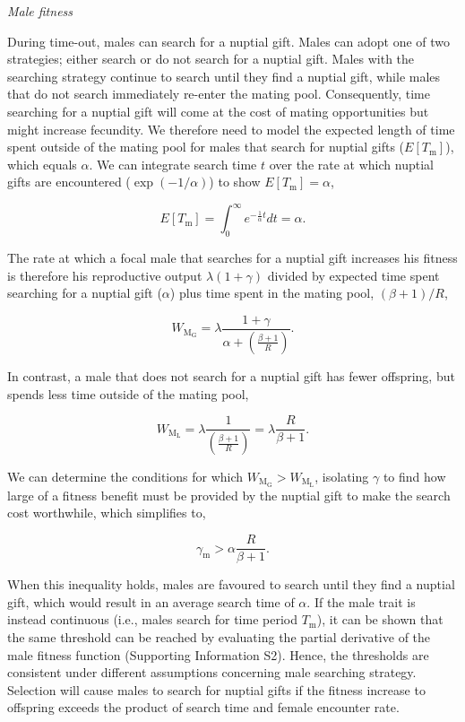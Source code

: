 \documentclass[
]{article}
\begin{document}
\emph{Male fitness}

During time-out, males can search for a nuptial gift. Males can adopt
one of two strategies; either search or do not search for a nuptial
gift. Males with the searching strategy continue to search until they
find a nuptial gift, while males that do not search immediately re-enter
the mating pool. Consequently, time searching for a nuptial gift will
come at the cost of mating opportunities but might increase fecundity.
We therefore need to model the expected length of time spent outside of
the mating pool for males that search for nuptial gifts
(\(E[T_{\mathrm{m}}]\)), which equals \(\alpha\). We can integrate
search time \(t\) over the rate at which nuptial gifts are encountered
(\(\exp(-1/\alpha)\)) to show \(E[T_{\mathrm{m}}] = \alpha\),

\[E[T_{\mathrm{m}}] = \int_{0}^{\infty}e^{- \frac{1}{\alpha}t}dt = \alpha.\]

The rate at which a focal male that searches for a nuptial gift
increases his fitness is therefore his reproductive output
\(\lambda(1 + \gamma)\) divided by expected time spent searching for a
nuptial gift (\(\alpha\)) plus time spent in the mating pool,
\((\beta + 1)/R\),

\[W_{\mathrm{M_{G}}} = \lambda \frac{1 + \gamma}{\alpha + \left( \frac{\beta + 1}{R} \right)}.\]

In contrast, a male that does not search for a nuptial gift has fewer
offspring, but spends less time outside of the mating pool,

\[W_{\mathrm{M_{L}}} = \lambda \frac{1}{\left(\frac{\beta+1}{R} \right)} = \lambda \frac{R}{\beta + 1}.\]

We can determine the conditions for which
\(W_{\mathrm{M_{G}}} > W_{\mathrm{M_{L}}}\), isolating \(\gamma\) to
find how large of a fitness benefit must be provided by the nuptial gift
to make the search cost worthwhile, which simplifies to,

\[\gamma_{\mathrm{m}} > \alpha \frac{R}{\beta + 1}.
\tag{2}
\]

When this inequality holds, males are favoured to search until they find
a nuptial gift, which would result in an average search time of
\(\alpha\). If the male trait is instead continuous (i.e., males search
for time period \(T_{\mathrm{m}}\)), it can be shown that the same
threshold can be reached by evaluating the partial derivative of the
male fitness function (Supporting Information S2). Hence, the thresholds
are consistent under different assumptions concerning male searching
strategy. Selection will cause males to search for nuptial gifts if the
fitness increase to offspring exceeds the product of search time and
female encounter rate.
\end{document}
